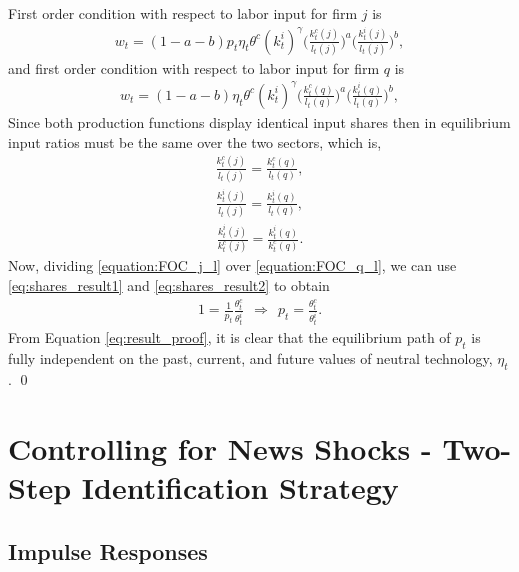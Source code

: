 \documentclass[12pt]{article}
\begin{document}
First order condition with respect to labor input for firm $j$ is
\begin{eqnarray}\label{equation:FOC_j_l}
w_t =  (1 - a - b) p_t \eta_t \theta^c (k^i_t)^{\gamma} \bigg( \frac{k_t^c(j)}{l_t(j)} \bigg)^a \bigg( \frac{k_t^i(j)}{l_t(j)} \bigg)^b,
\end{eqnarray}
and first order condition with respect to labor input for firm $q$ is
\begin{eqnarray}\label{equation:FOC_q_l}
w_t = (1 - a - b) \eta_t \theta^c (k^i_t)^{\gamma} \bigg( \frac{k_t^c(q)}{l_t(q)} \bigg)^a \bigg( \frac{k_t^i(q)}{l_t(q)} \bigg)^b,
\end{eqnarray}
Since both production functions display identical input shares then in equilibrium input ratios must be the same over the two sectors, which is,
\begin{eqnarray}\label{eq:shares_result1}
\frac{k_t^c(j)}{l_t(j)} = \frac{k_t^c(q)}{l_t(q)},
\end{eqnarray}
\begin{eqnarray}\label{eq:shares_result2}
\frac{k_t^i(j)}{l_t(j)} = \frac{k_t^i(q)}{l_t(q)},
\end{eqnarray}
\begin{eqnarray*}\label{eq:shares_result3}
\frac{k_t^i(j)}{k^c_t(j)} = \frac{k_t^i(q)}{k^c_t(q)}.
\end{eqnarray*}
Now, dividing \ref{equation:FOC_j_l} over \ref{equation:FOC_q_l}, we can use \ref{eq:shares_result1} and \ref{eq:shares_result2} to obtain
\begin{eqnarray}\label{eq:result_proof}
1 = \frac{1}{p_t} \frac{\theta^c_t}{\theta^i_t} \ \ \Rightarrow \ \ p_t = \frac{\theta^c_t}{\theta^i_t}.
\end{eqnarray}
From Equation \ref{eq:result_proof}, it is clear that the equilibrium path of $p_t$ is fully independent on the past, current, and future values of neutral technology, $\eta_t$. 
\qed

\newpage

\section{Controlling for News Shocks - Two-Step Identification Strategy}

\subsection{Impulse Responses}\label{section:IRF_2step}
\end{document}
